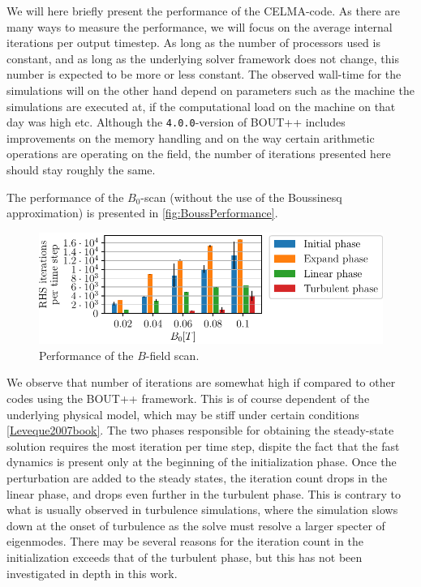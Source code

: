 %
We will here briefly present the performance of the CELMA-code.
As there are many ways to measure the performance, we will focus on the average internal iterations per output timestep.
As long as the number of processors used is constant, and as long as the underlying solver framework does not change, this number is expected to be more or less constant.
The observed wall-time for the simulations will on the other hand depend on parameters such as the machine the simulations are executed at, if the computational load on the machine on that day was high etc.
Although the \texttt{4.0.0}-version of BOUT++ includes improvements on the memory handling and on the way certain arithmetic operations are operating on the field, the number of iterations presented here should stay roughly the same.

The performance of the $B_0$-scan (without the use of the Boussinesq approximation) is presented in \cref{fig:BoussPerformance}.
%
\begin{figure}[htb]
    \centering
    \includegraphics{fig/results/performance/RHSEvalsPerTimeBScan}
    \caption{Performance of the $B$-field scan.}
    \label{fig:BPerformance}
\end{figure}
%
We observe that number of iterations are somewhat high if compared to other codes using the BOUT++ framework.
This is of course dependent of the underlying physical model, which may be stiff under certain conditions \cref{Leveque2007book}.
The two phases responsible for obtaining the steady-state solution requires the most iteration per time step, dispite the fact that the fast dynamics is present only at the beginning of the initialization phase.
Once the perturbation are added to the steady states, the iteration count drops in the linear phase, and drops even further in the turbulent phase.
This is contrary to what is usually observed in turbulence simulations, where the simulation slows down at the onset of turbulence as the solve must resolve a larger specter of eigenmodes.
There may be several reasons for the iteration count in the initialization exceeds that of the turbulent phase, but this has not been investigated in depth in this work.
